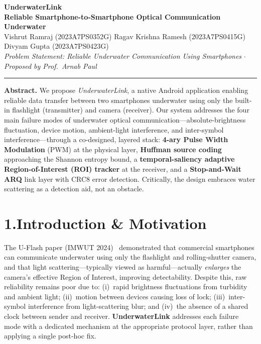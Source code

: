 \documentclass[10pt,a4paper]{article}
\begin{document}
\begin{center}
  {\Large\textbf{UnderwaterLink}}\\[0.3em]
  {\normalsize\textbf{Reliable Smartphone-to-Smartphone Optical Communication Underwater}}\\[0.5em]
  {\small
    Vishrut Ramraj (2023A7PS0352G)\quad
    Ragav Krishna Ramesh (2023A7PS0415G)\quad
    Divyam Gupta (2023A7PS0423G)\\[0.2em]
    \textit{Problem Statement: Reliable Underwater Communication Using Smartphones}\quad
    $\cdot$\quad\textit{Proposed by Prof.\ Arnab Paul}
  }
\end{center}
\vspace{0.5em}\hrule\vspace{0.7em}

\noindent\textbf{Abstract.}\;
We propose \emph{UnderwaterLink}, a native Android application enabling reliable data
transfer between two smartphones underwater using only the built-in flashlight (transmitter)
and camera (receiver). Our system addresses the four main failure modes of underwater
optical communication---absolute-brightness fluctuation, device motion, ambient-light
interference, and inter-symbol interference---through a co-designed, layered stack:
\textbf{4-ary Pulse Width Modulation} (PWM) at the physical layer,
\textbf{Huffman source coding} approaching the Shannon entropy bound,
a \textbf{temporal-saliency adaptive Region-of-Interest (ROI) tracker} at the receiver,
and a \textbf{Stop-and-Wait ARQ} link layer with CRC8 error detection.
Critically, the design embraces water scattering as a detection aid, not an obstacle.

\vspace{0.5em}
\section{1.\enspace Introduction \& Motivation}

The U-Flash paper (IMWUT 2024)~\cite{uflash} demonstrated that commercial smartphones can
communicate underwater using only the flashlight and rolling-shutter camera, and that light
scattering---typically viewed as harmful---actually \emph{enlarges} the camera's effective
Region of Interest, improving detectability. Despite this, raw reliability remains poor due to:
(i)~rapid brightness fluctuations from turbidity and ambient light;
(ii)~motion between devices causing loss of lock;
(iii)~inter-symbol interference from light-scattering blur; and
(iv)~the absence of a shared clock between sender and receiver.
\textbf{UnderwaterLink} addresses each failure mode with a dedicated mechanism at the
appropriate protocol layer, rather than applying a single post-hoc fix.
\end{document}
